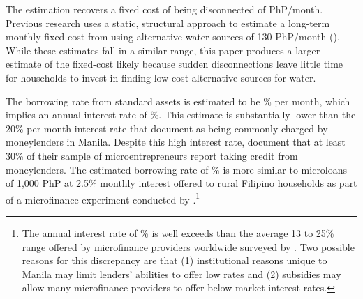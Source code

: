\documentclass[12pt]{article}
\begin{document}
The estimation recovers a fixed cost of being disconnected of PhP/month.  Previous research uses a static, structural approach to estimate a long-term monthly fixed cost from using alternative water sources of 130 PhP/month (\cite{wjv}).  While these estimates fall in a similar range, this paper produces a larger estimate of the fixed-cost likely because sudden disconnections leave little time for households to invest in finding low-cost alternative sources for water.

The borrowing rate from standard assets is estimated to be \unskip\% per month, which implies an annual interest rate of \unskip\%.  This estimate is substantially lower than the 20\% per month interest rate that \cite{karlan2009expanding} document as being commonly charged by moneylenders in Manila.  Despite this high interest rate, \cite{karlan2009expanding} document that at least 30\% of their sample of microentrepreneurs report taking credit from moneylenders.  The estimated borrowing rate of \unskip\% is more similar to microloans of 1,000 PhP at 2.5\% monthly interest offered to rural Filipino households as part of a microfinance experiment conducted by \cite{gine2014group}.\footnote{The annual interest rate of \unskip\% is well exceeds than the average 13 to 25\% range offered by microfinance providers worldwide surveyed by \cite{cull2009microfinance}.  Two possible reasons for this discrepancy are that (1) institutional reasons unique to Manila may limit lenders' abilities to offer low rates and (2) subsidies may allow many microfinance providers to offer below-market interest rates.}
\end{document}
